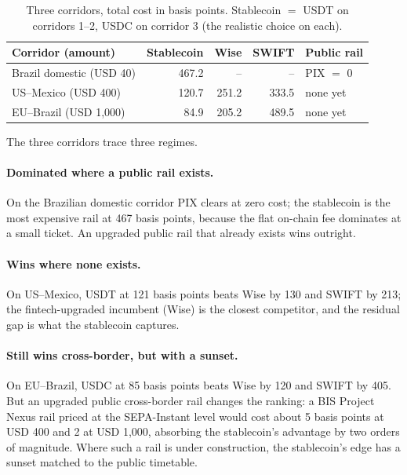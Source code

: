\documentclass[12pt]{article}
\begin{document}
\begin{table}[H]
\centering
\caption{Three corridors, total cost in basis points. Stablecoin $=$ USDT on corridors 1--2, USDC on corridor 3 (the realistic choice on each).}\label{tab:uc_dt}
\begin{tabular}{lrrrl}
\toprule
Corridor (amount) & Stablecoin & Wise & SWIFT & Public rail \\
\midrule
Brazil domestic (USD 40)    & 467.2 & --    & --    & PIX $=$ 0 \\
US--Mexico (USD 400)        & 120.7 & 251.2 & 333.5 & none yet \\
EU--Brazil (USD 1{,}000)    & 84.9  & 205.2 & 489.5 & none yet \\
\bottomrule
\end{tabular}
\end{table}

The three corridors trace three regimes.

\paragraph{Dominated where a public rail exists.}\label{sub:bra_domestic} On the Brazilian domestic corridor PIX clears at zero cost; the stablecoin is the most expensive rail at 467 basis points, because the flat on-chain fee dominates at a small ticket. An upgraded public rail that already exists wins outright.

\paragraph{Wins where none exists.} On US--Mexico, USDT at 121 basis points beats Wise by 130 and SWIFT by 213; the fintech-upgraded incumbent (Wise) is the closest competitor, and the residual gap is what the stablecoin captures.

\paragraph{Still wins cross-border, but with a sunset.}\label{sub:eu_br} On EU--Brazil, USDC at 85 basis points beats Wise by 120 and SWIFT by 405. But an upgraded public cross-border rail changes the ranking: a BIS Project Nexus rail \citep{bis_nexus_2024} priced at the SEPA-Instant level would cost about 5 basis points at USD 400 and 2 at USD 1{,}000, absorbing the stablecoin's advantage by two orders of magnitude. Where such a rail is under construction, the stablecoin's edge has a sunset matched to the public timetable.
\end{document}
